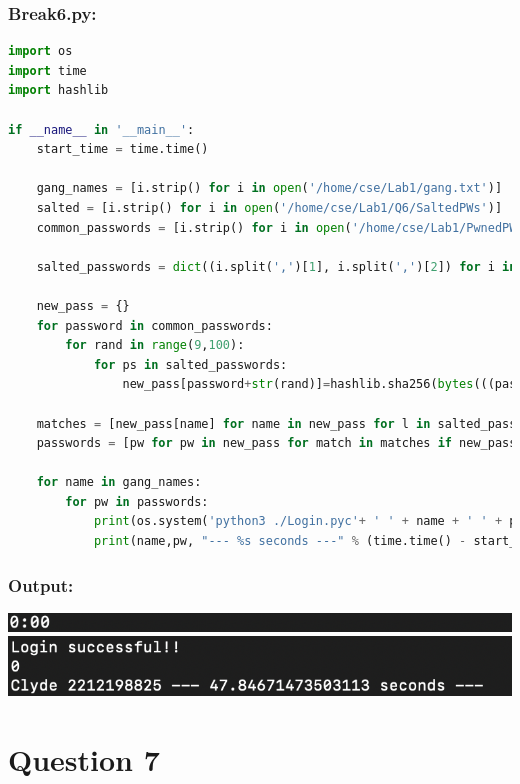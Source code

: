 \documentclass{article}
\begin{document}
\subsubsection*{Break6.py:}
\begin{lstlisting}[language=Python]
import os
import time
import hashlib

if __name__ in '__main__':
    start_time = time.time()

    gang_names = [i.strip() for i in open('/home/cse/Lab1/gang.txt')]
    salted = [i.strip() for i in open('/home/cse/Lab1/Q6/SaltedPWs')]
    common_passwords = [i.strip() for i in open('/home/cse/Lab1/PwnedPWs100k.txt')]

    salted_passwords = dict((i.split(',')[1], i.split(',')[2]) for i in salted if i.split(',')[0] in gang_names)
    
    new_pass = {}
    for password in common_passwords:
        for rand in range(9,100):
            for ps in salted_passwords:         
                new_pass[password+str(rand)]=hashlib.sha256(bytes(((password + str(rand))+salted_passwords[ps]), 'utf-8')).hexdigest()[2:-1]

    matches = [new_pass[name] for name in new_pass for l in salted_passwords if new_pass[name] == l]
    passwords = [pw for pw in new_pass for match in matches if new_pass[pw] == match]

    for name in gang_names:
        for pw in passwords:
            print(os.system('python3 ./Login.pyc'+ ' ' + name + ' ' + pw) )
            print(name,pw, "--- %s seconds ---" % (time.time() - start_time))
\end{lstlisting}

\subsubsection*{Output:}
\begin{center}
    \includegraphics[scale=.863]{images/0.png}
    \includegraphics[scale=.8]{images/Q6_Output.png}
\end{center}
\section{Question 7}
\end{document}

